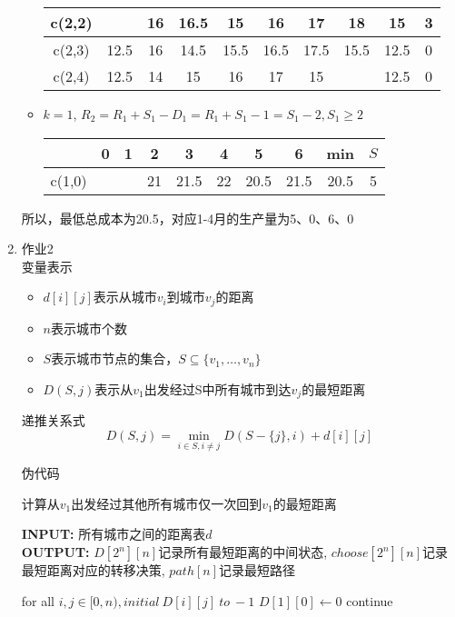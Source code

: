 \documentclass{article}
\begin{document}
\begin{enumerate}
\begin{itemize}
\begin{table}[H]
\begin{tabular}{c|c|c|c|c|c|c|c|c|c}
						c(2,2)& & 16& 16.5& 15& 16& 17& 18& 15& 3\\ \hline
						c(2,3)& 12.5& 16& 14.5& 15.5& 16.5& 17.5& 15.5& 12.5& 0\\ \hline
						c(2,4)& 12.5& 14& 15& 16& 17& 15& & 12.5& 0\\ \hline
						\hline
					\end{tabular}
				\end{table}
			\item $k=1$, $R_2=R_1+S_1-D_1=R_1+S_1-1=S_1-2, S_1\geq 2$
				\begin{table}[H]
					\centering
					\begin{tabular}{c|c|c|c|c|c|c|c|c|c}
						\hline\hline
						& 0 & 1 & 2 & 3 & 4 & 5  & 6 & min & $S$\\ \hline    
						c(1,0)& & & 21& 21.5& 22& 20.5& 21.5& 20.5& 5\\ \hline
						\hline
					\end{tabular}
				\end{table}
		\end{itemize}
		
		所以，最低总成本为20.5，对应1-4月的生产量为5、0、6、0
		
		\item 作业2\\
		
		变量表示
		\begin{itemize}
			\item $d[i][j]$表示从城市$v_i$到城市$v_j$的距离
			\item $n$表示城市个数
			\item $S$表示城市节点的集合，$S \subseteq \{v_1,\ldots,v_n\}$
			\item $D(S, j)$表示从$v_1$出发经过S中所有城市到达$v_j$的最短距离
		\end{itemize}
	
		递推关系式
		$$D(S, j) = \min_{i\in S, i\neq j}D(S-\{j\}, i)+d[i][j]$$
		
		伪代码
		\begin{algorithm}[H]
			\centering
			\caption{计算从$v_1$出发经过其他所有城市仅一次回到$v_1$的最短距离}
			\begin{flushleft}
				\textbf{INPUT:} 所有城市之间的距离表$d$\\
				\textbf{OUTPUT:} $D[2^n][n]$记录所有最短距离的中间状态, $choose[2^n][n]$记录最短距离对应的转移决策, $path[n]$记录最短路径
			\end{flushleft}
			\begin{algorithmic}
				\STATE for all $i,j \in [0, n), initial\ D[i][j]\ to\ -1$
				\STATE $D[1][0] \gets 0$
						\STATE continue
						\ENDIF
						

\end{algorithmic}
\end{algorithm}
\end{enumerate}
\end{document}
